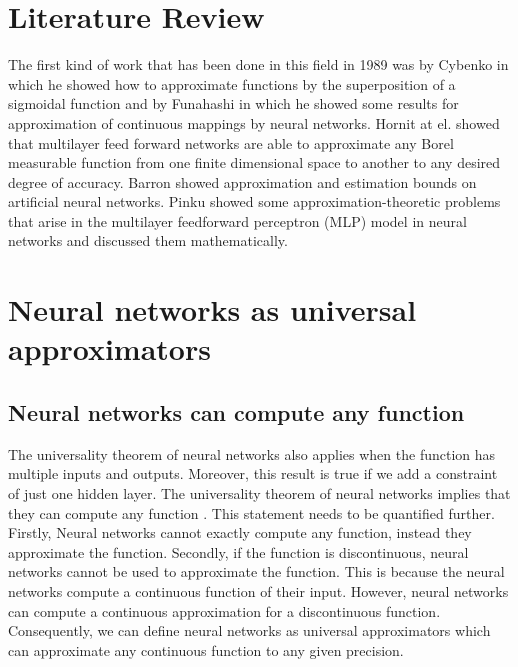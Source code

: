 \documentclass{article}
\begin{document}
\section{Literature Review}
The first kind of work that has been done in this field in 1989 was by Cybenko \cite{paper1989_1} in which he showed how to approximate functions by the superposition of a sigmoidal function and by Funahashi \cite{paper1989_2} in which he showed some results for approximation of continuous mappings by neural networks. Hornit at el. \cite{paper1989_3} showed that multilayer feed forward networks are able to approximate any Borel measurable function from one finite dimensional space to another to any desired degree of accuracy. Barron \cite{paper1994} showed approximation and estimation bounds on artificial neural networks. Pinku \cite{paper1999} showed some approximation-theoretic problems that arise in the multilayer feedforward perceptron (MLP) model in neural networks and discussed them mathematically.
\section{Neural networks as universal approximators}
\subsection{Neural networks can compute any function}
The universality theorem of neural networks also applies when the function has multiple inputs and outputs. Moreover, this result is true if we add a constraint of just one hidden layer. The universality theorem of neural networks implies that they can compute any function \cite{website1}. This statement needs to be quantified further. Firstly, Neural networks cannot exactly compute any function, instead they approximate the function. Secondly, if the function is discontinuous, neural networks cannot be used to approximate the function. This is because the neural networks compute a continuous function of their input. However, neural networks can compute a continuous approximation for a discontinuous function. Consequently, we can define neural networks as universal approximators which can approximate any continuous function to any given precision.
\end{document}
